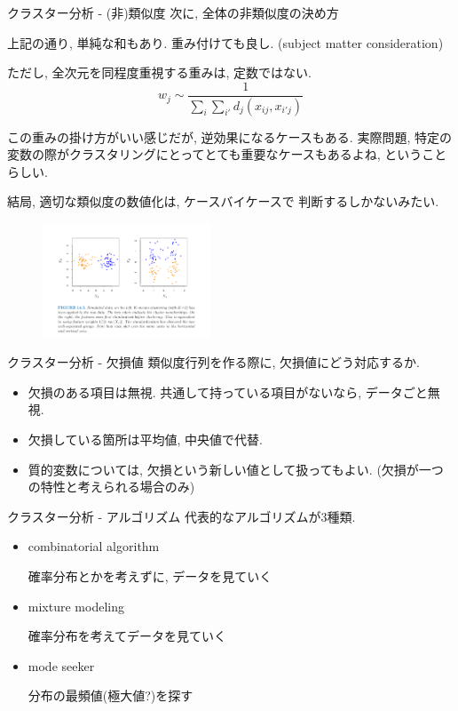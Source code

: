 \documentclass[dvipdfmx,8pt]{beamer}
\begin{document}
  \begin{frame}{クラスター分析 - (非)類似度}
    次に, 全体の非類似度の決め方

    上記の通り, 単純な和もあり. 重み付けても良し. (subject matter consideration)

    ただし, 全次元を同程度重視する重みは, 定数ではない.
    \[
      w_j\sim \frac{1}{\sum_i\sum_{i'}d_j(x_{ij},x_{i'j})}
    \]

    この重みの掛け方がいい感じだが, 逆効果になるケースもある.
    実際問題, 特定の変数の際がクラスタリングにとってとても重要なケースもあるよね, ということらしい.

    結局, 適切な類似度の数値化は, ケースバイケースで
    判断するしかないみたい.
    \begin{figure}[htb]
      \centering
      \includegraphics[width=5cm,clip]{images/missclustering.png}
    \end{figure}
  \end{frame}
  \begin{frame}{クラスター分析 - 欠損値}
    類似度行列を作る際に, 欠損値にどう対応するか.
    \begin{itemize}
      \item 欠損のある項目は無視. 共通して持っている項目がないなら, データごと無視.
      \item 欠損している箇所は平均値, 中央値で代替.
      \item 質的変数については, 欠損という新しい値として扱ってもよい. (欠損が一つの特性と考えられる場合のみ)
    \end{itemize}
  \end{frame}
  \begin{frame}{クラスター分析 - アルゴリズム}
    代表的なアルゴリズムが3種類.
    \begin{itemize}
      \item combinatorial algorithm

        確率分布とかを考えずに, データを見ていく
      \item mixture modeling

        確率分布を考えてデータを見ていく
      \item mode seeker

        分布の最頻値(極大値?)を探す
    \end{itemize}

  \end{frame}
\end{document}
